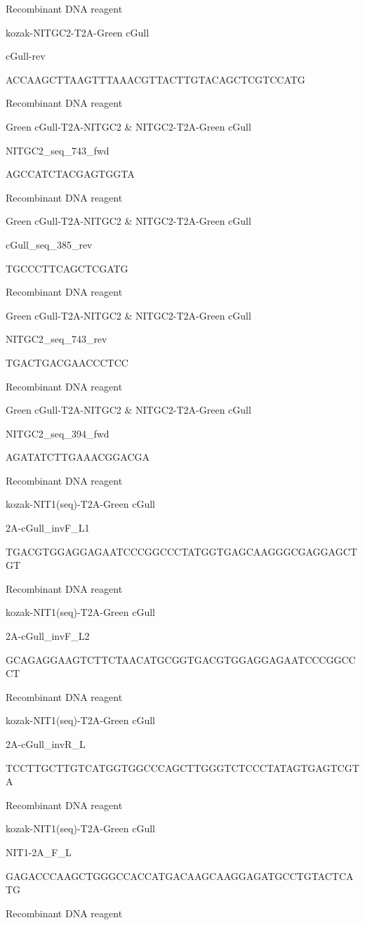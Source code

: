 \documentclass[
  10pt,
  onecolumn]{article}
\begin{document}
Recombinant DNA reagent

kozak-NITGC2-T2A-Green cGull

cGull-rev

ACCAAGCTTAAGTTTAAACGTTACTTGTACAGCTCGTCCATG

Recombinant DNA reagent

Green cGull-T2A-NITGC2 \& NITGC2-T2A-Green cGull

NITGC2\_seq\_743\_fwd

AGCCATCTACGAGTGGTA

Recombinant DNA reagent

Green cGull-T2A-NITGC2 \& NITGC2-T2A-Green cGull

cGull\_seq\_385\_rev

TGCCCTTCAGCTCGATG

Recombinant DNA reagent

Green cGull-T2A-NITGC2 \& NITGC2-T2A-Green cGull

NITGC2\_seq\_743\_rev

TGACTGACGAACCCTCC

Recombinant DNA reagent

Green cGull-T2A-NITGC2 \& NITGC2-T2A-Green cGull

NITGC2\_seq\_394\_fwd

AGATATCTTGAAACGGACGA

Recombinant DNA reagent

kozak-NIT1(seq)-T2A-Green cGull

2A-cGull\_invF\_L1

TGACGTGGAGGAGAATCCCGGCCCTATGGTGAGCAAGGGCGAGGAGCTGT

Recombinant DNA reagent

kozak-NIT1(seq)-T2A-Green cGull

2A-cGull\_invF\_L2

GCAGAGGAAGTCTTCTAACATGCGGTGACGTGGAGGAGAATCCCGGCCCT

Recombinant DNA reagent

kozak-NIT1(seq)-T2A-Green cGull

2A-cGull\_invR\_L

TCCTTGCTTGTCATGGTGGCCCAGCTTGGGTCTCCCTATAGTGAGTCGTA

Recombinant DNA reagent

kozak-NIT1(seq)-T2A-Green cGull

NIT1-2A\_F\_L

GAGACCCAAGCTGGGCCACCATGACAAGCAAGGAGATGCCTGTACTCATG

Recombinant DNA reagent
\end{document}
